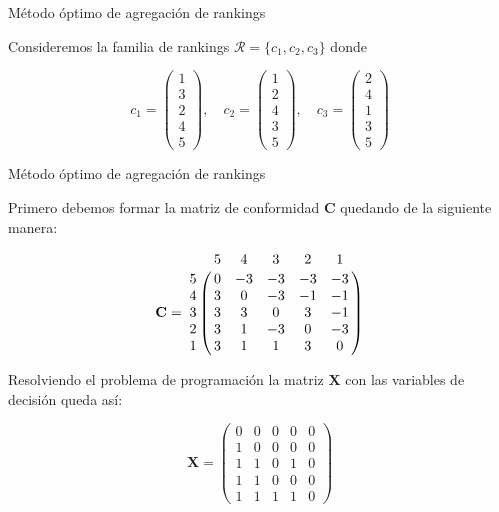 \documentclass[10pt]{beamer}
\begin{document}
	\begin{frame}{Método óptimo de agregación de rankings}
		\begin{ejemplo}
			Consideremos la familia de rankings $\mathcal{R} = \{c_1, c_2, c_3\}$ donde
			
			\begin{equation*}
			c_1 = \left( \begin{array}{c}
			1\\
			3\\
			2\\
			4\\
			5
			\end{array} \right), \quad
			c_2 = \left( \begin{array}{c}
			1\\
			2\\
			4\\
			3\\
			5
			\end{array} \right), \quad
			c_3 = \left( \begin{array}{c}
			2\\
			4\\
			1\\
			3\\
			5
			\end{array} \right)
			\end{equation*}
			
		\end{ejemplo}
	\end{frame}
	
	\begin{frame}{Método óptimo de agregación de rankings}
		\begin{ejemplo}[continuación]
			Primero debemos formar la matriz de conformidad $\mathbf{C}$ quedando de la siguiente manera:
					
			\begin{equation*}
			\mathbf{C} = \bordermatrix{
			  & 5 & 4 & 3 & 2 & 1 \cr
			5 & 0 & -3 & -3 & -3 & -3 \cr
			4 & 3 &  0 & -3 & -1 & -1 \cr
			3 & 3 &  3 &  0 &  3 & -1 \cr
			2 & 3 &  1 & -3 &  0 & -3 \cr
			1 & 3 &  1 &  1	&  3 &	0 \cr
			}
			\end{equation*}
			
			Resolviendo el problema de programación la matriz $\mathbf{X}$ con las variables de decisión queda así:
			
			\begin{equation*}
			\mathbf{X} = \left(\begin{array}{rrrrr}
			0 & 0 & 0 & 0 & 0 \\
			1 & 0 & 0 & 0 & 0 \\
			1 & 1 & 0 & 1 & 0 \\
			1 & 1 & 0 & 0 & 0 \\
			1 & 1 & 1 & 1 &	0
			\end{array}\right)
			\end{equation*}
			
			
		\end{ejemplo}
	\end{frame}
	
\end{document}
